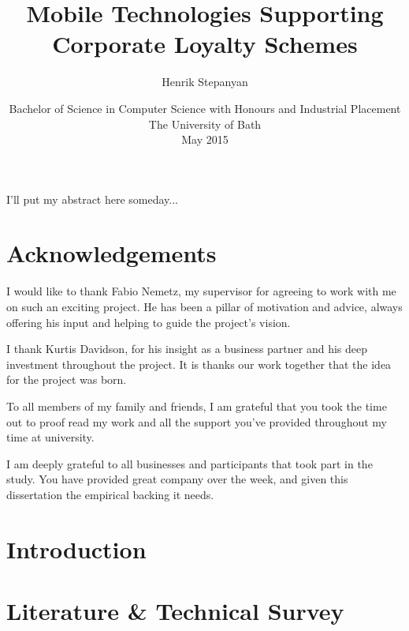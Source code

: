 \documentclass[11pt,openright,a4paper]{report}
\title{Mobile Technologies Supporting Corporate Loyalty Schemes}
\author{Henrik Stepanyan}
\date{Bachelor of Science in Computer Science with Honours and Industrial
Placement\\The University of Bath\\May 2015}
\begin{document}
\lstset{language=Java,breaklines,breakatwhitespace,basicstyle=\small}


\setcounter{page}{0}


\maketitle
\newpage


\newpage


\newpage


\abstract
I'll put my abstract here someday...
\newpage


\tableofcontents
\listoffigures
\newpage

\chapter*{Acknowledgements}
I would like to thank Fabio Nemetz, my supervisor for agreeing to work with me
on such an exciting project. He has been a pillar of motivation and advice,
always offering his input and helping to guide the project's vision.

I thank Kurtis Davidson, for his insight as a business partner and his deep
investment throughout the project. It is thanks our work together that the idea
for the project was born.

To all members of my family and friends, I am grateful that you took the time 
out to proof read my work and all the support you've provided throughout
my time at university.

I am deeply grateful to all businesses and participants that took part in
the study. You have provided great company over the week, and given this
dissertation the empirical backing it needs.

\newpage


\setcounter{page}{1}



\chapter{Introduction}


\chapter{Literature \& Technical Survey}

\end{document}
